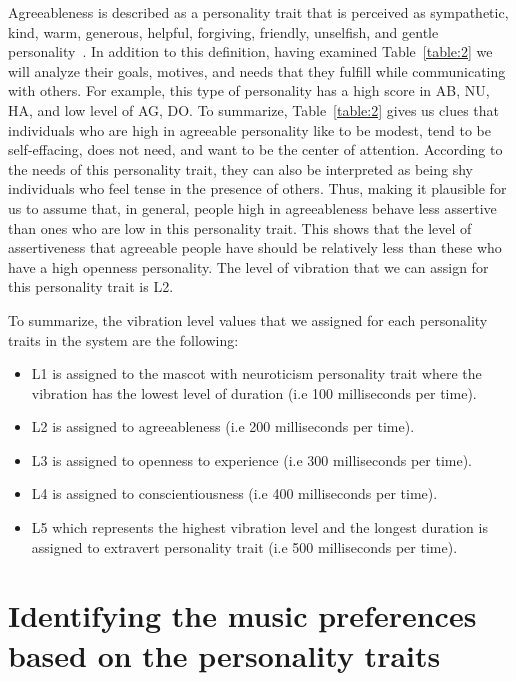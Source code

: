 Agreeableness is described as a personality trait that is perceived as sympathetic,
kind, warm, generous, helpful, forgiving, friendly, unselfish, and gentle personality~\cite{matthews2003personality}.
In addition to this definition, having examined Table~\ref{table:2} we will
analyze their goals, motives, and needs that they fulfill while communicating with others.
For example, this type of personality has a high score in AB, NU, HA, and low level
of AG, DO. To summarize, Table~\ref{table:2} gives us clues that individuals who
are high in agreeable personality like to be modest, tend to be self-effacing,
does not need, and want to be the center of attention.
According to the needs of this personality trait, they can also be interpreted as
being shy individuals who feel tense in the presence of others.
Thus, making it plausible for us to assume that, in general, people high in agreeableness
behave less assertive than ones who are low in this personality trait.
This shows that the level of assertiveness that agreeable people have should be
relatively less than these who have a high openness personality.
The level of vibration that we can assign for this personality trait is L2.


To summarize, the vibration level values that we assigned for each personality traits in the system are the following:
\begin{itemize}
    \item L1 is assigned to the mascot with neuroticism personality trait where the
    vibration has the lowest level of duration (i.e 100 milliseconds per time).
    \item L2 is assigned to agreeableness (i.e 200 milliseconds per time).
    \item L3 is assigned to openness to experience (i.e 300 milliseconds per time).
    \item L4 is assigned to conscientiousness (i.e 400 milliseconds per time).
    \item L5 which represents the highest vibration level and the longest duration
    is assigned to extravert personality trait (i.e 500 milliseconds per time).
\end{itemize}



\section{Identifying the music preferences based on the personality traits}
\label{sec:Identifying the music preferences based on the personality traits}

